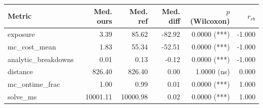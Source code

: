 \begin{tabular}{lrrrrr}
\toprule
Metric & Med. ours & Med. ref & Med. diff & $p$ (Wilcoxon) & $r_{rb}$ \\
\midrule
exposure & 3.39 & 85.62 & -82.92 & 0.0000 (***) & -1.000 \\
mc_cost_mean & 1.83 & 55.34 & -52.51 & 0.0000 (***) & -1.000 \\
analytic_breakdowns & 0.01 & 0.13 & -0.12 & 0.0000 (***) & -1.000 \\
distance & 826.40 & 826.40 & 0.00 & 1.0000 (ns) & 0.000 \\
mc_ontime_frac & 1.00 & 0.99 & 0.01 & 0.0000 (***) & 1.000 \\
solve_ms & 10001.11 & 10000.98 & 0.02 & 0.0000 (***) & 1.000 \\
\bottomrule
\end{tabular}
